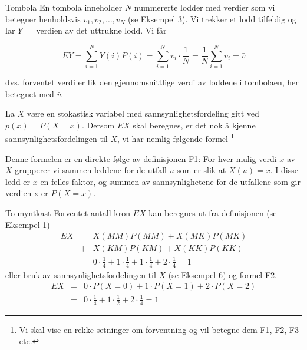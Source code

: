 \begin{eksempel}{Tombola}
En tombola inneholder $N$ nummererte lodder med verdier som vi betegner
henholdsvis {$v_1, v_2, \ldots , v_N$} (se Eksempel 3). Vi trekker et
lodd tilfeldig og lar $Y=$ verdien av det uttrukne lodd. Vi får

\[ EY=\sum_{i=1}^{N}Y(i)P(i)=\sum_{i=1}^{N}v_i \cdot \frac{1}{N}=
                      \frac{1}{N}\sum_{i=1}^{N}v_i=\bar{v} \]

\noindent  dvs. forventet verdi er lik den gjennomsnittlige verdi av loddene
i tombolaen, her betegnet med $\bar{v}$.
\end{eksempel}

La $X$ være en stokastisk variabel med sannsynlighetsfordeling
gitt ved $p(x)=P(X=x)$. Dersom $EX$ skal beregnes, er det nok å
kjenne sann\-synlighetsfordelingen til $X$, vi har nemlig følgende
formel \footnote{Vi skal vise en rekke setninger om forventning
og vil betegne dem F1, F2, F3 etc.}

\begin{center}  \end{center}
\noindent Denne formelen er en direkte følge av definisjonen F1: For hver
mulig verdi $x$ av $X$ grupperer vi sammen leddene for de utfall
$u$ som er slik at $X(u)=x$. I disse ledd er $x$ en felles
faktor, og summen av sannsynlighetene for de utfallene som gir verdien x er
$P(X=x)$. \\

\begin{eksempel}{To myntkast}
Forventet antall kron $EX$ kan beregnes ut fra definisjonen (se Eksempel 1)
\begin{eqnarray*} 
  EX&=&X(MM)P(MM)+X(MK)P(MK) \\
    &+&X(KM)P(KM)+X(KK)P(KK) \\
    &=&0 \cdot \frac{1}{4}+1 \cdot \frac{1}{4}+1 \cdot \frac{1}{4}+
                            2 \cdot \frac{1}{4}=1
\end{eqnarray*}
\noindent eller bruk av sannsynlighetsfordelingen til $X$ (se Eksempel
6) og formel F2.
\begin{eqnarray*}
  EX&=&0 \cdot P(X=0)+1 \cdot P(X=1)+2 \cdot P(X=2) \\
    &=&0 \cdot \frac{1}{4}+1 \cdot \frac{1}{2}+2 \cdot \frac{1}{4}=1
\end{eqnarray*}
\end{eksempel}

